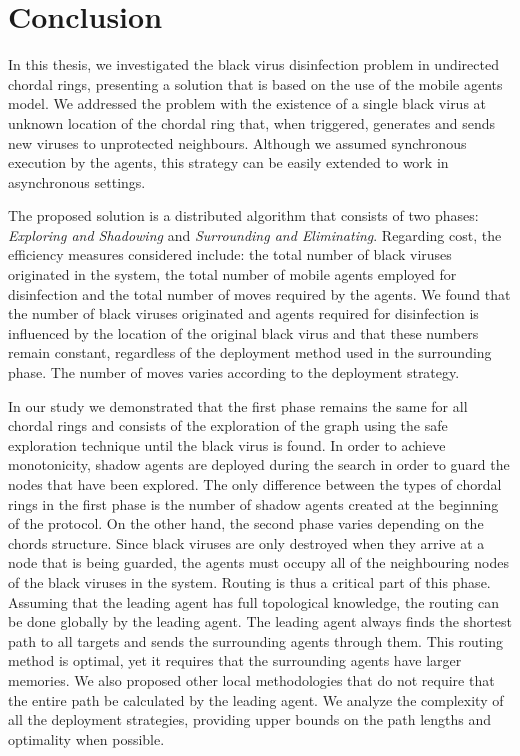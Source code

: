 \chapter {Conclusion}
\label{CON}

In  this thesis, we investigated the black virus disinfection problem in undirected chordal rings, presenting  a solution that is based on the use of the mobile agents model.
We addressed  the problem with the existence of  a single black virus at unknown location of the chordal ring that, when triggered, generates and sends new viruses to unprotected neighbours.  Although we assumed synchronous execution by the agents,  this strategy can be easily extended to work in asynchronous settings. 

The proposed solution is a distributed algorithm that consists of two phases: {\em Exploring and Shadowing} and {\em Surrounding and Eliminating}. Regarding cost, the efficiency measures considered include: the total number of black viruses originated in the system, the total number of mobile agents employed for disinfection and the total number of moves required by the agents. We found that the number of black viruses originated and agents required for disinfection is influenced by the location of the original black virus and that these numbers remain constant, regardless of the deployment method used in the surrounding phase. The number of moves varies according to the deployment strategy.


In our study we demonstrated that the first phase remains the same for all chordal rings and consists of the exploration of the graph using the safe exploration technique until the black virus is found. In order to achieve monotonicity, shadow agents are deployed during the search in order to guard the nodes that have been explored. The only difference between the types of chordal rings in the first phase is the number of shadow agents created at the beginning of the protocol. On the other hand, the second phase varies depending on the chords structure. Since black viruses are only destroyed when they arrive at a node that is being guarded, the agents must occupy all of the neighbouring nodes of the black viruses in the system. Routing is thus a critical part of this phase.
Assuming that the leading agent has full topological knowledge, the routing can be done globally by the leading agent. The leading agent always finds the shortest path to all targets and sends the surrounding agents through them. This routing method is optimal, yet it requires that the surrounding agents have larger memories. We also proposed other local methodologies that do not require that the entire path be calculated by the leading agent. We analyze the complexity of all the deployment strategies, providing upper bounds on the path lengths and optimality when possible.

